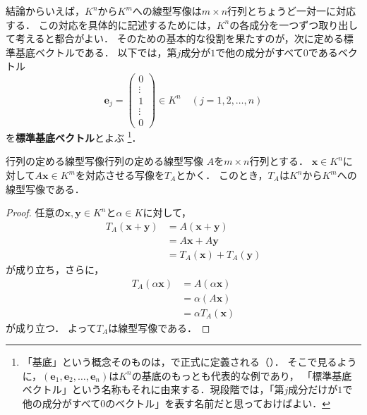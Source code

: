 結論からいえば，$K^n$から$K^m$への線型写像は$m \times n$行列とちょうど一対一に対応する．
この対応を具体的に記述するためには，$K^n$の各成分を一つずつ取り出して考えると都合がよい．
そのための基本的な役割を果たすのが，次に定める標準基底ベクトルである．
以下では，第$j$成分が$1$で他の成分がすべて$0$であるベクトル
\[
  \bm{e}_j =
  \begin{pmatrix}
    0 \\ \vdots \\ 1 \\ \vdots \\ 0
  \end{pmatrix}
  \in K^n
  \quad (j = 1, 2, \dots, n)
\]
を\textbf{標準基底ベクトル}とよぶ
\footnote{「基底」という概念そのものは，で正式に定義される（）．
そこで見るように，$(\bm{e}_1, \bm{e}_2, \dots, \bm{e}_n)$は$K^n$の基底のもっとも代表的な例であり，
「標準基底ベクトル」という名称もそれに由来する．現段階では，「第$j$成分だけが$1$で他の成分がすべて$0$のベクトル」を表す名前だと思っておけばよい．}．

\begin{prop}{行列の定める線型写像}{行列の定める線型写像}
  $A$を$m \times n$行列とする．
  $\bm{x} \in K^n$に対して$A\bm{x} \in K^m$を対応させる写像を$T_A$とかく．
  このとき，$T_A$は$K^n$から$K^m$への線型写像である．
\end{prop}

\begin{tleftbar}
\begin{proof}
  任意の$\bm{x}, \bm{y} \in K^n$と$\alpha \in K$に対して，
  \begin{align}
    T_A(\bm{x} + \bm{y}) &= A(\bm{x} + \bm{y}) \tag{$T_A$の定義} \\
    &= A\bm{x} + A\bm{y} \tag{行列の積の分配律} \\
    &= T_A(\bm{x}) + T_A(\bm{y}) \nonumber
  \end{align}
  が成り立ち，さらに，
  \begin{align}
    T_A(\alpha\bm{x}) &= A(\alpha\bm{x}) \tag{$T_A$の定義} \\
    &= \alpha(A\bm{x}) \tag{行列の積の性質} \\
    &= \alpha T_A(\bm{x}) \nonumber
  \end{align}
  が成り立つ．
  よって$T_A$は線型写像である．
\end{proof}
\end{tleftbar}


